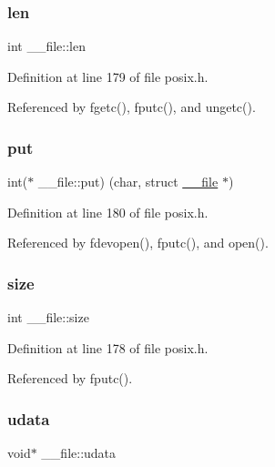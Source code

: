 \subsubsection{\texorpdfstring{len}{len}}
{\footnotesize\ttfamily int \+\_\+\+\_\+file\+::len}



Definition at line 179 of file posix.\+h.



Referenced by fgetc(), fputc(), and ungetc().

\mbox{\label{struct____file_a01c8b217e42cc11b6a7f8429114e9d46}} 
\subsubsection{\texorpdfstring{put}{put}}
{\footnotesize\ttfamily int($\ast$ \+\_\+\+\_\+file\+::put) (char, struct \hyperlink{struct____file}{\+\_\+\+\_\+file} $\ast$)}



Definition at line 180 of file posix.\+h.



Referenced by fdevopen(), fputc(), and open().

\mbox{\label{struct____file_aff4a1ca8b6a12460812928afae81248d}} 
\subsubsection{\texorpdfstring{size}{size}}
{\footnotesize\ttfamily int \+\_\+\+\_\+file\+::size}



Definition at line 178 of file posix.\+h.



Referenced by fputc().

\mbox{\label{struct____file_abe6f3bdb4df4119277132eb3e13a4628}} 
\subsubsection{\texorpdfstring{udata}{udata}}
{\footnotesize\ttfamily void$\ast$ \+\_\+\+\_\+file\+::udata}



